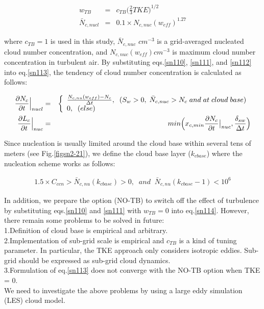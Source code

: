 \begin{eqnarray}
w_{TB}&=&c_{TB}\bigl(\frac{2}{3}TKE\bigr)^{1/2}\label{sn112}\\
\bar{N}_{c,nucl}&=&0.1\times N_{c,nuc}(w_{eff})^{1.27}\label{sn113}
\end{eqnarray}

where $c_{TB} = 1$ is used in this study, $\bar{N}_{c,nuc}$ $cm^{-3}$ is a grid-averaged nucleated cloud number concentration, and $N_{c,nuc}(w_{eff}) cm^{-3}$ is maximum cloud number concentration in turbulent air. By substituting eqs.\ref{sn110}, \ref{sn111}, and \ref{sn112} into eq.\ref{sn113}, the tendency of cloud number concentration is calculated as follows:

\begin{eqnarray}
\frac{\partial N_{c}}{\partial t}\Bigr|_{nucl}&=&
\left\{
\begin{array}{l}
\frac{N_{c,nu}(w_{eff})-N_{c}}{\Delta t},\;\;(S_{w}>0,\;\bar{N}_{c,nuc}>N_{c}\;and\;at\;cloud\;base) \\
0,\;\;(else) \\
\label{sn114}
\end{array}
\right.\\
\frac{\partial L_{c}}{\partial t}\Bigr|_{nuc}&=&min\Bigl(x_{c,min}\frac{\partial N_{c}}{\partial t}\bigr|_{nuc},\frac{\delta_{sw}}{\Delta t}\Bigr)\label{sn115}
\end{eqnarray}

Since nucleation is usually limited around the cloud base within several tens of meters (see Fig.\ref{figsn2-21}), we define the cloud base layer ($k_{cbase}$) where the nucleation scheme works as follows:

\begin{eqnarray}
1.5 \times C_{ccn} > \bar{N}_{c,nu}(k_{cbase})>0,\;\;and\;\;\bar{N}_{c,nu}(k_{cbase}-1) < 10^{6}\label{sn116}
\end{eqnarray}

In addition, we prepare the option (NO-TB) to switch off the effect of turbulence by substituting eqs.\ref{sn110} and \ref{sn111} with $w_{TB} = 0$ into eq.\ref{sn114}. However, there remain some problems to be solved in future:\\
1.Definition of cloud base is empirical and arbitrary.\\
2.Implementation of sub-grid scale is empirical and $c_{TB}$ is a kind of tuning parameter. In particular, the TKE approach only considers isotropic eddies. Sub-grid should be expressed as sub-grid cloud dynamics.\\
3.Formulation of eq.\ref{sn113} does not converge with the NO-TB option when TKE = 0.\\
We need to investigate the above problems by using a large eddy simulation (LES) cloud model.

